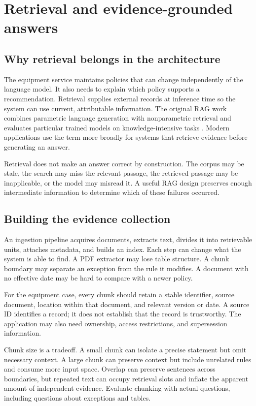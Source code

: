 \chapter{Retrieval and evidence-grounded answers}
\section{Why retrieval belongs in the architecture}
The equipment service maintains policies that can change independently of the language model. It also needs to explain which policy supports a recommendation. Retrieval supplies external records at inference time so the system can use current, attributable information. The original RAG work combines parametric language generation with nonparametric retrieval and evaluates particular trained models on knowledge-intensive tasks \cite{rag}. Modern applications use the term more broadly for systems that retrieve evidence before generating an answer.

Retrieval does not make an answer correct by construction. The corpus may be stale, the search may miss the relevant passage, the retrieved passage may be inapplicable, or the model may misread it. A useful RAG design preserves enough intermediate information to determine which of these failures occurred.

\section{Building the evidence collection}
An ingestion pipeline acquires documents, extracts text, divides it into retrievable units, attaches metadata, and builds an index. Each step can change what the system is able to find. A PDF extractor may lose table structure. A chunk boundary may separate an exception from the rule it modifies. A document with no effective date may be hard to compare with a newer policy.

For the equipment case, every chunk should retain a stable identifier, source document, location within that document, and relevant version or date. A source ID identifies a record; it does not establish that the record is trustworthy. The application may also need ownership, access restrictions, and supersession information.

Chunk size is a tradeoff. A small chunk can isolate a precise statement but omit necessary context. A large chunk can preserve context but include unrelated rules and consume more input space. Overlap can preserve sentences across boundaries, but repeated text can occupy retrieval slots and inflate the apparent amount of independent evidence. Evaluate chunking with actual questions, including questions about exceptions and tables.


